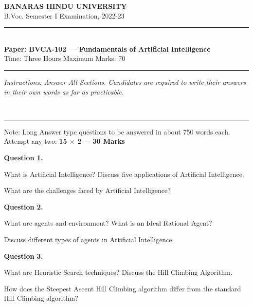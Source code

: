 \documentclass[11pt,a4paper]{article}
\begin{document}
\begin{center}
  {\large\bfseries BANARAS HINDU UNIVERSITY}\\[2pt]
  {\normalsize B.Voc. Semester I Examination, 2022-23}\\[6pt]
  \rule{0.8\linewidth}{0.5pt}\\[6pt]
  {\large\bfseries Paper: BVCA-102 --- Fundamentals of Artificial Intelligence}\\[4pt]
  {\normalsize Time: Three Hours \hfill Maximum Marks: 70}
\end{center}

\rule{\linewidth}{0.4pt}

\smallskip



\noindent   \textit{Instructions: Answer All Sections. Candidates are required to write their answers in their own words as far as practicable.}

\bigskip

\smallskip

\bigskip


\\[4pt]
\rule{\linewidth}{0.4pt}\smallskip

Note: Long Answer type questions to be answered in about 750 words each. Attempt any two: \hfill   \textbf{15 $ \times$ 2 = 30 Marks}

\medskip


\noindent   \textbf{Question 1.}

\begin{parts}
  \item What is Artificial Intelligence? Discuss five applications of Artificial Intelligence.
  \item What are the challenges faced by Artificial Intelligence?
\end{parts}

\medskip


\noindent   \textbf{Question 2.}

\begin{parts}
  \item What are agents and environment? What is an Ideal Rational Agent?
  \item Discuss different types of agents in Artificial Intelligence.
\end{parts}

\medskip


\noindent   \textbf{Question 3.}

\begin{parts}
  \item What are Heuristic Search techniques? Discuss the Hill Climbing Algorithm.
  \item How does the Steepest Ascent Hill Climbing algorithm differ from the standard Hill Climbing algorithm?
\end{parts}
\end{document}
